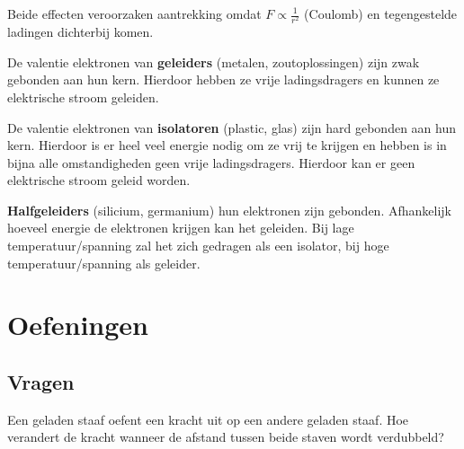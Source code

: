 \begin{fullpage}
\begin{samenvatting}
\begin{tcolorbox}[title=Polarisatie en Influentie,colback=white,colframe=black,sharp corners]
		Beide effecten veroorzaken aantrekking omdat \(F \propto \frac{1}{r^2}\) (Coulomb) en tegengestelde ladingen dichterbij komen.
	\end{tcolorbox}
	\begin{tcolorbox}[title=Geleider\text{, }Isolator en Halfgeleider,colback=white,colframe=black,sharp corners]
		De valentie elektronen van \textbf{geleiders} (metalen, zoutoplossingen) zijn zwak gebonden aan hun kern. Hierdoor hebben ze vrije ladingsdragers en kunnen ze elektrische stroom geleiden.

		De valentie elektronen van \textbf{isolatoren} (plastic, glas) zijn hard gebonden aan hun kern. Hierdoor is er heel veel energie nodig om ze vrij te krijgen en hebben is in bijna alle omstandigheden geen vrije ladingsdragers. Hierdoor kan er geen elektrische stroom geleid worden.

		\textbf{Halfgeleiders} (silicium, germanium) hun elektronen zijn gebonden. Afhankelijk hoeveel energie de elektronen krijgen kan het geleiden. Bij lage temperatuur/spanning zal het zich gedragen als  een isolator, bij hoge temperatuur/spanning als geleider.
	\end{tcolorbox}
\end{samenvatting}
\end{fullpage}
\newpage
\section{Oefeningen}%
\subsection{Vragen}\label{vragen:coulombkracht}%


\begin{vraag}\label{vH1:i1}
Een geladen staaf oefent een kracht uit op een andere geladen staaf. Hoe verandert de kracht wanneer de afstand tussen beide staven wordt verdubbeld?
\end{vraag}

